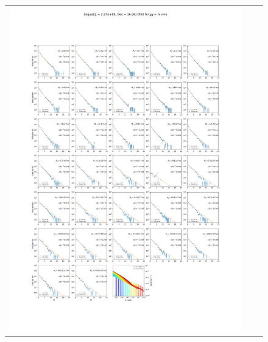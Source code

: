 \begin{figure}[t]
{\begin{tabular}{ccc}
            \includegraphics[clip, trim=22.1cm 6.5cm 19.5cm 56.5cm, scale=0.55]{figures/ic_DM/dm_plots/Segue1_mumu_chi2_Masspanel_2024-03-23.pdf} &

\end{tabular}}
\end{figure}
